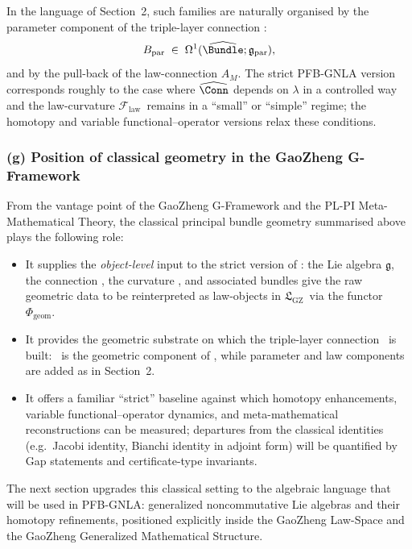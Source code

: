 \documentclass[11pt]{book}
\theoremstyle{plain}
\theoremstyle{definition}
\newcommand{\GZLS}{\ensuremath{\mathfrak{L}_{\mathrm{GZ}}}}       \newcommand{\GZLT}{\ensuremath{M_{!w}}}                           \newcommand{\GZLOC}{\ensuremath{A_M}}                             \newcommand{\GZLCurv}{\ensuremath{\mathcal{F}_{\mathrm{law}}}}
\begin{document}
In the language of Section~2, such families are naturally organised by
the parameter component of the triple-layer connection \GZTLC:
\[
   B_{\mathrm{par}}
   \;\in\;
   \Omega^1(\widehat{\Bundle};\mathfrak{g}_{\mathrm{par}}),
\]
and by the pull-back of the law-connection \GZLOC. The strict PFB-GNLA
version corresponds roughly to the case where
$\widehat{\Conn}$ depends on $\lambda$ in a controlled way and the
law-curvature \GZLCurv\ remains in a “small” or “simple” regime; the
homotopy and variable functional–operator versions relax these
conditions.



\subsubsection*{(g) Position of classical geometry in the GaoZheng G-Framework}

From the vantage point of the GaoZheng G-Framework and the PL-PI
Meta-Mathematical Theory, the classical principal bundle geometry
summarised above plays the following role:

\begin{itemize}
  \item It supplies the \emph{object-level} input to the strict
        version of \GAlgebra: the Lie algebra $\mathfrak{g}$, the
        connection \Conn, the curvature \Curv, and associated bundles
        give the raw geometric data to be reinterpreted as law-objects
        in \GZLS\ via the functor $\Phi_{\mathrm{geom}}$.
  \item It provides the geometric substrate on which the triple-layer
        connection \GZTLC\ is built: \Conn\ is the geometric component
        of \GZTLC, while parameter and law components are added as in
        Section~2.
  \item It offers a familiar “strict” baseline against which homotopy
        enhancements, variable functional–operator dynamics, and
        meta-mathematical reconstructions can be measured; departures
        from the classical identities (e.g.\ Jacobi identity, Bianchi
        identity in adjoint form) will be quantified by Gap
        statements and certificate-type invariants.
\end{itemize}

The next section upgrades this classical setting to the algebraic
language that will be used in PFB-GNLA: generalized noncommutative
Lie algebras and their homotopy refinements, positioned explicitly
inside the GaoZheng Law-Space and the GaoZheng Generalized
Mathematical Structure.
\end{document}
